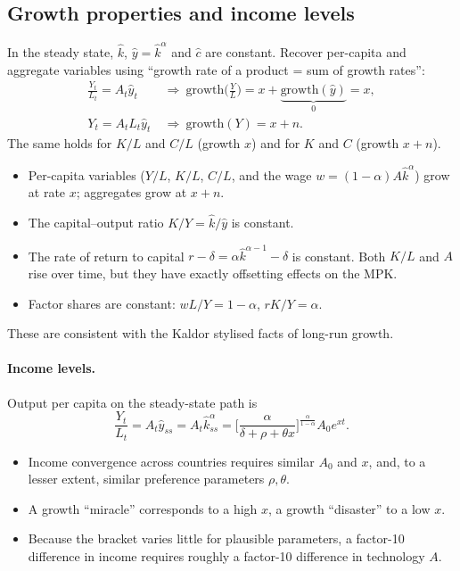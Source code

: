 \subsection{Growth properties and income levels }

In the steady state, $\hat k$, $\hat y=\hat k^\alpha$ and $\hat c$ are constant. Recover per-capita and aggregate variables using ``growth rate of a product = sum of growth rates'':
\begin{align*}
\frac{Y_t}{L_t}=A_t\hat y_t\ &\Rightarrow\ \text{growth}\Big(\frac{Y}{L}\Big)=x+\underbrace{\text{growth}(\hat y)}_{0}=x,\\
Y_t=A_tL_t\hat y_t\ &\Rightarrow\ \text{growth}(Y)=x+n .
\end{align*}
The same holds for $K/L$ and $C/L$ (growth $x$) and for $K$ and $C$ (growth $x+n$).

\begin{keybox}[title={Long-run growth properties (also hold in Solow)}]
\begin{itemize}
\item Per-capita variables ($Y/L$, $K/L$, $C/L$, and the wage $w=(1-\alpha)A\hat k^\alpha$) grow at rate $x$; aggregates grow at $x+n$.
\item The capital--output ratio $K/Y=\hat k/\hat y$ is constant.
\item The rate of return to capital $r-\delta=\alpha\hat k^{\alpha-1}-\delta$ is constant. Both $K/L$ and $A$ rise over time, but they have exactly offsetting effects on the MPK.
\item Factor shares are constant: $wL/Y=1-\alpha$, $rK/Y=\alpha$.
\end{itemize}
These are consistent with the Kaldor stylised facts of long-run growth.
\end{keybox}

\paragraph{Income levels.} Output per capita on the steady-state path is
\[
\frac{Y_t}{L_t}=A_t\hat y_{ss}=A_t\hat k_{ss}^{\alpha}=\Big[\frac{\alpha}{\delta+\rho+\theta x}\Big]^{\frac{\alpha}{1-\alpha}}A_0e^{xt}.
\]
\begin{itemize}
\item Income convergence across countries requires similar $A_0$ and $x$, and, to a lesser extent, similar preference parameters $\rho,\theta$.
\item A growth ``miracle'' corresponds to a high $x$, a growth ``disaster'' to a low $x$.
\item Because the bracket varies little for plausible parameters, a factor-10 difference in income requires roughly a factor-10 difference in technology $A$.
\end{itemize}


